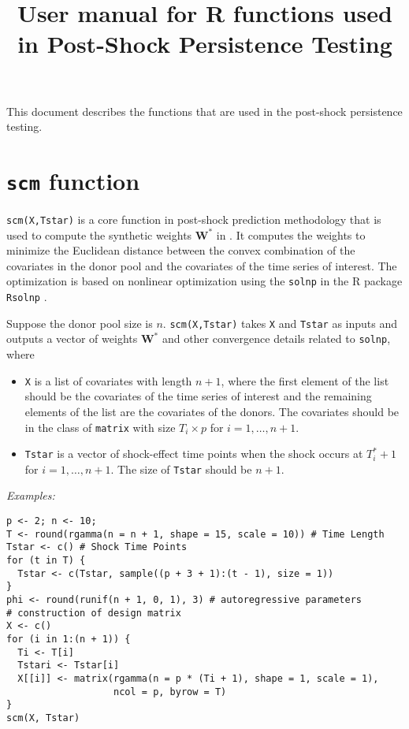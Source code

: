 \documentclass[12pt]{article}
\title{User manual for R functions used in Post-Shock Persistence Testing}
\begin{document}
\maketitle 

This document describes the functions that are used in the post-shock persistence testing.

\tableofcontents

\section{\texttt{scm} function}

\texttt{scm(X,Tstar)} is  a core function in post-shock prediction methodology that is used to compute the synthetic weights $\mathbf{W}^*$ in . It computes the weights to minimize the Euclidean distance between the convex combination of the covariates in the donor pool and the covariates of the time series of interest. The optimization is based on  nonlinear optimization using the \texttt{solnp} in the  R package \texttt{Rsolnp} \cite{ghalanos2012package}.

Suppose the donor pool size is $n$. \texttt{scm(X,Tstar)} takes \texttt{X} and \texttt{Tstar} as inputs and outputs a vector of weights $\mathbf{W}^*$ and other convergence details related to \texttt{solnp}, where
\begin{itemize}
	\item \texttt{X} is a list of covariates with length $n+1$, where the first element of the list should be the covariates of the time series of interest and the remaining elements of the list are the covariates of the donors. The covariates should be in the class of \texttt{matrix} with size $T_i\times p$ for $i = 1, \ldots, n+1$.
	\item \texttt{Tstar} is a vector of shock-effect time points when the shock occurs at $T^*_i+1$ for $i = 1, \ldots, n+1$. The size of \texttt{Tstar} should be $n+1$.
\end{itemize}

\emph{Examples:}

\begin{verbatim}
p <- 2; n <- 10;
T <- round(rgamma(n = n + 1, shape = 15, scale = 10)) # Time Length
Tstar <- c() # Shock Time Points
for (t in T) {
  Tstar <- c(Tstar, sample((p + 3 + 1):(t - 1), size = 1))
}
phi <- round(runif(n + 1, 0, 1), 3) # autoregressive parameters
# construction of design matrix
X <- c()
for (i in 1:(n + 1)) {
  Ti <- T[i]
  Tstari <- Tstar[i]
  X[[i]] <- matrix(rgamma(n = p * (Ti + 1), shape = 1, scale = 1),
                   ncol = p, byrow = T) 
}
scm(X, Tstar)
\end{verbatim}
\end{document}
